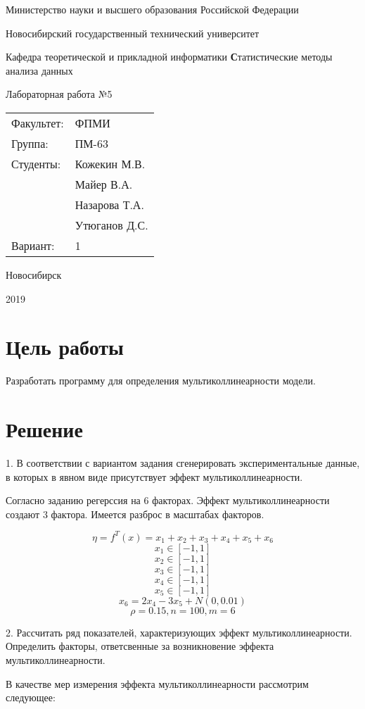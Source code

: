 ﻿\documentclass[12pt, a4paper]{article}
\newcommand{\insertTitle}[9]{
\begin{titlepage}
	\begin{center}
    	\large
		Министерство науки и высшего образования Российской Федерации
		
		Новосибирский государственный технический университет
		
		Кафедра теоретической и прикладной информатики
		\vfill
		{\textbf #1}
		
		Лабораторная работа №#2
		\vfill
	\end{center}
	
	\begin{tabular}{ m{7em}  m{7em} }
	Факультет: & ФПМИ \\ 
	Группа: & #3 \\  
	Студенты: & #4 \\
			   & #5 \\
			   & #6 \\
			   & #7 \\	
	Вариант: & #8
	\end{tabular}
	\vfill

\begin{center}
Новосибирск

#9
\end{center}
\end{titlepage}
}
\begin{document}
\setlength{\abovedisplayskip}{1pt}
\setlength{\belowdisplayskip}{1pt}



\insertTitle{Статистические методы анализа данных}{5}{ПМ-63}{Кожекин М.В.}{Майер В.А.}{Назарова Т.А.}{Утюганов Д.С.}{1}{2019}




\section{Цель работы}
Разработать программу для определения мультиколлинеарности модели.




\section{Решение}

1.	В соответствии с вариантом задания сгенерировать экспериментальные данные, в которых в явном виде присутствует эффект мультиколлинеарности.

Согласно заданию регерссия на 6 факторах. Эффект мультиколлинеарности создают 3 фактора. Имеется разброс в масштабах факторов.

\[ \eta = f^T(x) =  x_1 + x_2 + x_3 + x_4 + x_5 + x_6 \]
\[ x_1 \in [-1, 1] \]
\[ x_2 \in [-1, 1] \]
\[ x_3 \in [-1, 1] \]
\[ x_4 \in [-1, 1] \]
\[ x_5 \in [-1, 1] \]
\[ x_6  = 2 x_4 - 3 x_5 + N(0, 0.01) \]
\[ \rho = 0.15, n = 100, m = 6 \]




2. Рассчитать ряд показателей, характеризующих эффект мультиколлинеарности. Определить факторы, ответсвенные за возникновение  эффекта мультиколлинеарности.

В качестве мер измерения эффекта мультиколлинеарности рассмотрим следующее:
\end{document}
